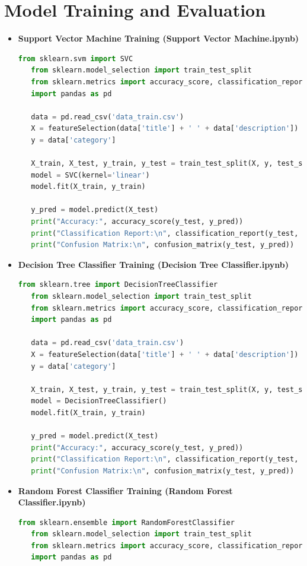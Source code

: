 \documentclass[10pt]{article}
\begin{document}
\section{Model Training and Evaluation}
\begin{itemize}
 \item \textbf{Support Vector Machine Training (Support Vector Machine.ipynb)}
   \begin{lstlisting}[language=Python]
   from sklearn.svm import SVC
   from sklearn.model_selection import train_test_split
   from sklearn.metrics import accuracy_score, classification_report, confusion_matrix
   import pandas as pd
   
   data = pd.read_csv('data_train.csv')
   X = featureSelection(data['title'] + ' ' + data['description'])
   y = data['category']
   
   X_train, X_test, y_train, y_test = train_test_split(X, y, test_size=0.2, random_state=42)
   model = SVC(kernel='linear')
   model.fit(X_train, y_train)
   
   y_pred = model.predict(X_test)
   print("Accuracy:", accuracy_score(y_test, y_pred))
   print("Classification Report:\n", classification_report(y_test, y_pred))
   print("Confusion Matrix:\n", confusion_matrix(y_test, y_pred))
   \end{lstlisting}

 \item \textbf{Decision Tree Classifier Training (Decision Tree Classifier.ipynb)}
   \begin{lstlisting}[language=Python]
   from sklearn.tree import DecisionTreeClassifier
   from sklearn.model_selection import train_test_split
   from sklearn.metrics import accuracy_score, classification_report, confusion_matrix
   import pandas as pd
   
   data = pd.read_csv('data_train.csv')
   X = featureSelection(data['title'] + ' ' + data['description'])
   y = data['category']
   
   X_train, X_test, y_train, y_test = train_test_split(X, y, test_size=0.2, random_state=42)
   model = DecisionTreeClassifier()
   model.fit(X_train, y_train)
   
   y_pred = model.predict(X_test)
   print("Accuracy:", accuracy_score(y_test, y_pred))
   print("Classification Report:\n", classification_report(y_test, y_pred))
   print("Confusion Matrix:\n", confusion_matrix(y_test, y_pred))
   \end{lstlisting}

 \item \textbf{Random Forest Classifier Training (Random Forest Classifier.ipynb)}
   \begin{lstlisting}[language=Python]
   from sklearn.ensemble import RandomForestClassifier
   from sklearn.model_selection import train_test_split
   from sklearn.metrics import accuracy_score, classification_report, confusion_matrix
   import pandas as pd
   

\end{lstlisting}
\end{itemize}
\end{document}
